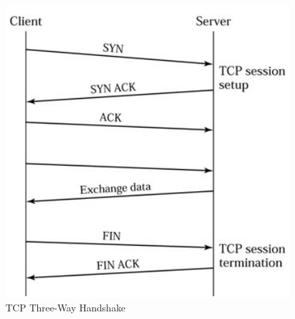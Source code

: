 \begin{figure}[!h]
	\begin{center}
		\includegraphics[width=0.6\linewidth]{images/loadbalancing9.jpg}
		\caption{TCP Three-Way Handshake \cite{LoadBalancing2}}
		\label{TCP Three-Way Handshake}
	\end{center}
\end{figure}

